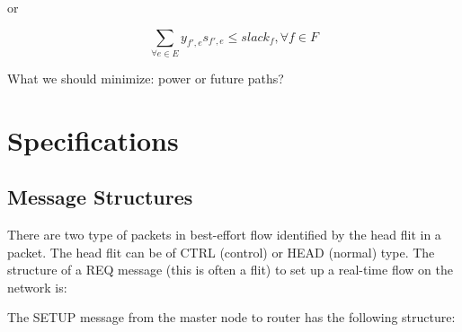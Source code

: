 \documentclass[conference, twocolumn]{IEEEtran}
\theoremstyle{definition}
\begin{document}
or

\begin{equation}\label{equ:e2eDelayModificatio3}
\sum_{\forall e \in E}y_{f',e}s_{f',e} \leq slack_f, \forall f \in F
\end{equation}

What we should minimize: power or future paths?

\section{Specifications}
\subsection{Message Structures}

There are two type of packets in best-effort flow identified by the head flit
in a packet. The head flit can be of CTRL (control) or HEAD (normal) type. The
structure of a REQ message (this is often a flit) to set up a real-time flow on the network is:

\begin{table}[htbp]
\begin{center}
\end{center}
\caption{REQ path message}
\label{table:PathMsg}
\end{table}

The SETUP message from the master node to router has the following structure:

\begin{table}[htbp]
\begin{center}
\end{center}
\caption{SETUP path message}
\label{table:PathMsg}
\end{table}
\end{document}
